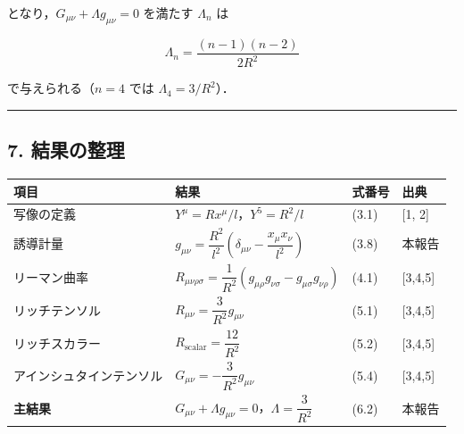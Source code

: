\documentclass[a4paper,11pt]{ltjsarticle}
\theoremstyle{definition}
\begin{document}
となり，\(G_{\mu\nu} + \Lambda g_{\mu\nu} = 0\) を満たす \(\Lambda_n\) は

\[\Lambda_n = \frac{(n-1)(n-2)}{2R^2}\]

で与えられる（\(n=4\) では \(\Lambda_4 = 3/R^2\)）．

\begin{center}\rule{0.5\linewidth}{0.5pt}\end{center}

\subsection{7. 結果の整理}\label{ux7d50ux679cux306eux6574ux7406}

{\def\LTcaptype{table} %
\begin{longtable}[]{@{}
  >{\raggedright\arraybackslash}p{}
  >{\raggedright\arraybackslash}p{}
  >{\raggedright\arraybackslash}p{}
  >{\raggedright\arraybackslash}p{}@{}}
\toprule\noalign{}
\begin{minipage}[b]{\linewidth}\raggedright
項目
\end{minipage} & \begin{minipage}[b]{\linewidth}\raggedright
結果
\end{minipage} & \begin{minipage}[b]{\linewidth}\raggedright
式番号
\end{minipage} & \begin{minipage}[b]{\linewidth}\raggedright
出典
\end{minipage} \\
\midrule\noalign{}
\endhead
\bottomrule\noalign{}
\endlastfoot
写像の定義 & \(Y^\mu = Rx^\mu/l\)，\(Y^5 = R^2/l\) & (3.1) & {[}1, 2{]} \\
誘導計量 & \(g_{\mu\nu} = \dfrac{R^2}{l^2}\!\left(\delta_{\mu\nu} - \dfrac{x_\mu x_\nu}{l^2}\right)\) & (3.8) & 本報告 \\
リーマン曲率 & \(R_{\mu\nu\rho\sigma} = \dfrac{1}{R^2}(g_{\mu\rho}g_{\nu\sigma}-g_{\mu\sigma}g_{\nu\rho})\) & (4.1) & {[}3,4,5{]} \\
リッチテンソル & \(R_{\mu\nu} = \dfrac{3}{R^2}g_{\mu\nu}\) & (5.1) & {[}3,4,5{]} \\
リッチスカラー & \(R_{\text{scalar}} = \dfrac{12}{R^2}\) & (5.2) & {[}3,4,5{]} \\
アインシュタインテンソル & \(G_{\mu\nu} = -\dfrac{3}{R^2}g_{\mu\nu}\) & (5.4) & {[}3,4,5{]} \\
\textbf{主結果} & \(G_{\mu\nu} + \Lambda g_{\mu\nu} = 0\)，\(\Lambda = \dfrac{3}{R^2}\) & (6.2) & 本報告 \\
\end{longtable}
}
\end{document}
